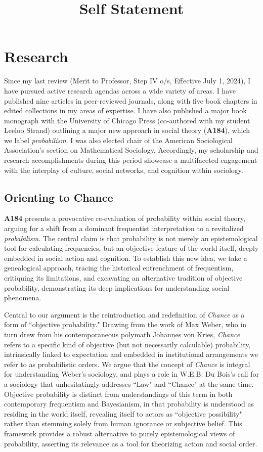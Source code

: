 \documentclass[a4paper,11pt]{extarticle}
\title{Self Statement}
\date{\vspace{-5ex}}
\begin{document}
\maketitle

\section*{Research}
Since my last review (Merit to Professor, Step IV o/s, Effective July 1, 2024), I have pursued active research agendas across a wide variety of areas. I have published nine articles in peer-reviewed journals, along with five book chapters in edited collections in my areas of expertise. I have also published a major book monograph with the University of Chicago Press (co-authored with my student Leeloo Strand) outlining a major new approach in social theory (\textbf{A184}), which we label \textit{probabilism}. I was also elected chair of the American Sociological Association's section on Mathematical Sociology. Accordingly, my scholarship and research accomplishments during this period showcase a multifaceted engagement with the interplay of culture, social networks, and cognition within sociology. 

\subsection*{Orienting to Chance}
\textbf{A184} presents a provocative re-evaluation of probability within social theory, arguing for a shift from a dominant frequentist interpretation to a revitalized         \textit{probabilism}. The central claim is that probability is not merely an epistemological tool for calculating frequencies, but an objective feature of the world itself, deeply embedded in social action and cognition. To establish this new idea, we take a genealogical approach, tracing the historical entrenchment of frequentism, critiquing its limitations, and excavating an alternative tradition of objective probability, demonstrating its deep implications for understanding social phenomena. 

Central to our argument is the reintroduction and redefinition of \textit{Chance} as a form of ``objective probability." Drawing from the work of Max Weber, who in turn drew from his contemporaneous polymath Johannes von Kries, \textit{Chance} refers to a specific kind of objective (but not necessarily calculable) probability, intrinsically linked to expectation and embedded in institutional arrangements we refer to as probabilistic orders. We argue that the concept of \textit{Chance} is integral for understanding Weber's sociology, and plays a role in W.E.B. Du Bois's call for a sociology that unhesitatingly addresses ``Law" and ``Chance" at the same time. Objective probability is distinct from understandings of this term in both contemporary frequentism and Bayesianism, in that probability is understood as residing in the world itself, revealing itself to actors as ``objective possibility" rather than stemming solely from human ignorance or subjective belief. This framework provides a robust alternative to purely epistemological views of probability, asserting its relevance as a tool for theorizing action and social order. 
\end{document}
